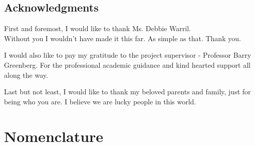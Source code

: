 \documentclass[12pt]{article}
\numberwithin{equation}{section}
\begin{document}
\begin{flushleft}
\subsection*{Acknowledgments} 
First and foremost, I would like to thank Ms. Debbie Warril. \\ Without you I wouldn't have made it this far. As simple as that. Thank you.

I would also like to pay my gratitude to the project supervisor - Professor Barry Greenberg. For the professional academic guidance and kind hearted support all along the way.

Last but not least, I would like to thank my beloved parents and family, just for being who you are. I believe we are lucky people in this world.

\newpage


\section*{Nomenclature} 


\end{flushleft}
\end{document}
